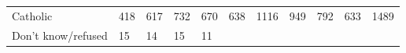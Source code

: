\documentclass[]{article}
\begin{document}
\begin{longtable}[]{@{}lllllllllll@{}}
\begin{minipage}[t]{0.14\columnwidth}
Catholic\strut
\end{minipage} & \begin{minipage}[t]{0.04\columnwidth}\raggedright\strut
418\strut
\end{minipage} & \begin{minipage}[t]{0.05\columnwidth}\raggedright\strut
617\strut
\end{minipage} & \begin{minipage}[t]{0.05\columnwidth}\raggedright\strut
732\strut
\end{minipage} & \begin{minipage}[t]{0.05\columnwidth}\raggedright\strut
670\strut
\end{minipage} & \begin{minipage}[t]{0.05\columnwidth}\raggedright\strut
638\strut
\end{minipage} & \begin{minipage}[t]{0.05\columnwidth}\raggedright\strut
1116\strut
\end{minipage} & \begin{minipage}[t]{0.06\columnwidth}\raggedright\strut
949\strut
\end{minipage} & \begin{minipage}[t]{0.06\columnwidth}\raggedright\strut
792\strut
\end{minipage} & \begin{minipage}[t]{0.04\columnwidth}\raggedright\strut
633\strut
\end{minipage} & \begin{minipage}[t]{0.11\columnwidth}\raggedright\strut
1489\strut
\end{minipage}\tabularnewline
\begin{minipage}[t]{0.14\columnwidth}\raggedright\strut
Don't know/refused\strut
\end{minipage} & \begin{minipage}[t]{0.04\columnwidth}\raggedright\strut
15\strut
\end{minipage} & \begin{minipage}[t]{0.05\columnwidth}\raggedright\strut
14\strut
\end{minipage} & \begin{minipage}[t]{0.05\columnwidth}\raggedright\strut
15\strut
\end{minipage} & \begin{minipage}[t]{0.05\columnwidth}\raggedright\strut
11\strut
\end{minipage} & \begin{minipage}[t]{0.05\columnwidth}\raggedright\strut

\end{minipage}
\end{longtable}
\end{document}
